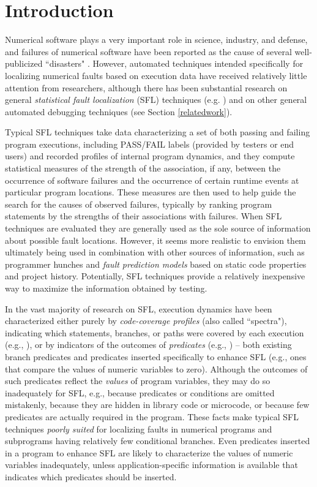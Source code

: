 \documentclass[times]{stvrauth}
\begin{document}
\section{Introduction}
\vspace{-2pt}
Numerical software plays a very important role in science, industry, and defense, and failures of numerical software have been reported as the cause of several well-publicized ``disasters" \cite{VuikWeb,Kanewala2014}.  However, automated techniques intended specifically for localizing numerical faults based on execution data have received relatively little attention from researchers, although there has been substantial research on general {\it statistical fault localization} (SFL) techniques (e.g. \cite{Jones2002,Liblit2004,Liu2005}) and on other general automated debugging techniques (see Section \ref{relatedwork}).

Typical SFL techniques take data characterizing a set of both passing and failing program executions, including PASS/FAIL labels (provided by testers or end users) and recorded profiles of internal program dynamics, and they compute statistical measures of the strength of the association, if any, between the occurrence of software failures and the occurrence of certain runtime events at particular program locations.  These measures are then used to help guide the search for the causes of observed failures, typically by ranking program statements by the strengths of their associations with failures.  When SFL techniques are evaluated they are generally used as the sole source of information about possible fault locations.  However, it seems more realistic to envision them ultimately being used in combination with other sources of information, such as programmer hunches and {\it fault prediction models} \cite{Fenton1999} based on static code properties and project history.  Potentially, SFL techniques provide a relatively inexpensive way to maximize the information obtained by testing.

 In the vast majority of research on SFL, execution dynamics have been characterized either purely by {\it code-coverage profiles} (also called ``spectra"), indicating which statements, branches, or paths were covered by each execution (e.g., \cite{Jones2002}), or by indicators of the outcomes of {\it predicates} (e.g., \cite{Liblit2004}) – both existing branch predicates and predicates inserted specifically to enhance SFL (e.g., ones that compare the values of numeric variables to zero).  Although the outcomes of such predicates reflect the {\it values} of program variables, they may do so inadequately for SFL, e.g., because predicates or conditions are omitted mistakenly, because they are hidden in library code or microcode, or because few predicates are actually required in the program.  These facts make typical SFL techniques {\it poorly suited} for localizing faults in numerical programs and subprograms having relatively few conditional branches.  Even predicates inserted in a program to enhance SFL are likely to characterize the values of numeric variables inadequately, unless application-specific information is available that indicates which predicates should be inserted.
\end{document}
